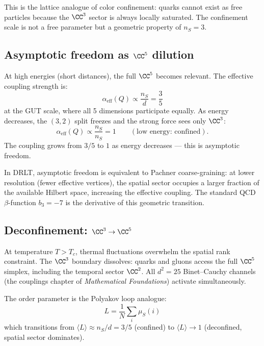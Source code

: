 This is the lattice analogue of color confinement: quarks cannot exist as free particles because the $\CC^3$ sector is always locally saturated. The confinement scale is not a free parameter but a geometric property of $n_S = 3$.

\subsection{Asymptotic freedom as $\CC^5$ dilution}

At high energies (short distances), the full $\CC^5$ becomes relevant. The effective coupling strength is:
\begin{equation}
\alpha_\text{eff}(Q) \propto \frac{n_S}{d} = \frac{3}{5}
\end{equation}
at the GUT scale, where all 5 dimensions participate equally. As energy decreases, the $(3,2)$ split freezes and the strong force sees only $\CC^3$:
\begin{equation}
\alpha_\text{eff}(Q) \propto \frac{n_S}{n_S} = 1 \qquad (\text{low energy: confined}).
\end{equation}
The coupling grows from $3/5$ to $1$ as energy decreases --- this is asymptotic freedom.

In DRLT, asymptotic freedom is equivalent to Pachner coarse-graining: at lower resolution (fewer effective vertices), the spatial sector occupies a larger fraction of the available Hilbert space, increasing the effective coupling. The standard QCD $\beta$-function $b_3 = -7$ is the derivative of this geometric transition.

\subsection{Deconfinement: $\CC^3 \to \CC^5$}

At temperature $T > T_c$, thermal fluctuations overwhelm the spatial rank constraint. The $\CC^3$ boundary dissolves: quarks and gluons access the full $\CC^5$ simplex, including the temporal sector $\CC^2$. All $d^2 = 25$ Binet--Cauchy channels (the couplings chapter of \textit{Mathematical Foundations}) activate simultaneously.

The order parameter is the Polyakov loop analogue:
\begin{equation}
L = \frac{1}{N}\sum_i \mu_S(i)
\end{equation}
which transitions from $\langle L\rangle \approx n_S/d = 3/5$ (confined) to $\langle L\rangle \to 1$ (deconfined, spatial sector dominates).


